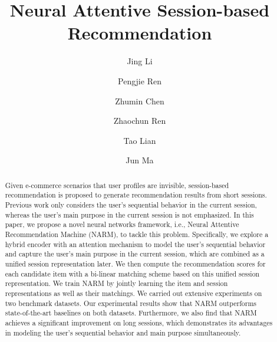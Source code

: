 \documentclass[sigconf]{acmart}
\begin{document}
\title{Neural Attentive Session-based Recommendation}

\author{Jing Li}

\author{Pengjie Ren}

\author{Zhumin Chen}

\author{Zhaochun Ren}

\author{Tao Lian}

\author{Jun Ma}

\renewcommand{\shortauthors}{J. Li et al.}


\begin{abstract}

Given e-commerce scenarios that user profiles are invisible, session-based recommendation is proposed to generate recommendation results from short sessions.
Previous work only considers the user's sequential behavior in the current session, whereas the user's main purpose in the current session is not emphasized.
In this paper, we propose a novel neural networks framework, i.e., Neural Attentive Recommendation Machine (NARM), to tackle this problem. Specifically, we explore a hybrid encoder with an attention mechanism to model the user's sequential behavior and capture the user's main purpose in the current session, which are combined as a unified session representation later. We then compute the recommendation scores for each candidate item with a bi-linear matching scheme based on this unified session representation. We train NARM by jointly learning the item and session representations as well as their matchings. 
We carried out extensive experiments on two benchmark datasets. Our experimental results show that NARM outperforms state-of-the-art baselines on both datasets. Furthermore, we also find that NARM achieves a significant improvement on long sessions, which demonstrates its advantages in modeling the user's sequential behavior and main purpose simultaneously.

\end{abstract}
\end{document}

